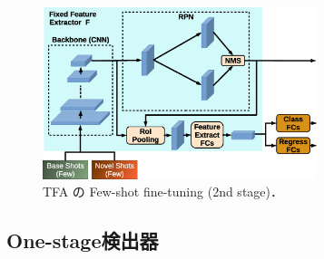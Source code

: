 \documentclass[twocolumn]{jsarticle} %
\begin{document}
\begin{figure}[tb]
    \begin{center}
        \includegraphics[width=8cm,clip]{fig/archi_TFA.eps}
    \end{center}
    \caption{ TFA の Few-shot fine-tuning (2nd stage)．}
    \label{fig:archi_TFA}
\end{figure}

\subsection{One-stage検出器}
\end{document}
